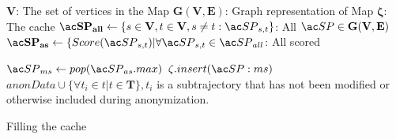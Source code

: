 \begin{algorithm}%
\dontprintsemicolon
\SetVline


\KwData
{

	\hspace{-0.6em}$\mathbf{V}$: The set of vertices in the Map \;
	\hspace{-0.6em}$\mathbf{G(V,E)}$: Graph representation of Map \;
	\hspace{-0.6em}$\mathbf{\zeta}$: The cache \;
	\hspace{-0.6em}$\mathbf{\spath_{all}} \leftarrow \{s \in \mathbf{V}, t \in \mathbf{V}, s \neq t : \spath_{s,t}\}$: All $\spath \in \mathbf{G(V,E)}$ \;
	\hspace{-0.6em}$\mathbf{\spath_{as}} \leftarrow \{Score(\spath_{s,t}) | \forall \spath_{s,t} \in \spath_{all}$: All scored \spaths \;
}


{
	$\spath_{ms} \leftarrow pop(\spath_{as}.max)$  \; 
	{
		$\zeta.insert(\spath:{ms})$\;
	}
}
\(anonData \cup \{\forall t_i  \in t  | t \in \mathbf{T}\}, t_i \) is a subtrajectory that has not been modified or otherwise included during anonymization.

\caption{Filling the cache}
\label{alg:greedy}
\end{algorithm}
